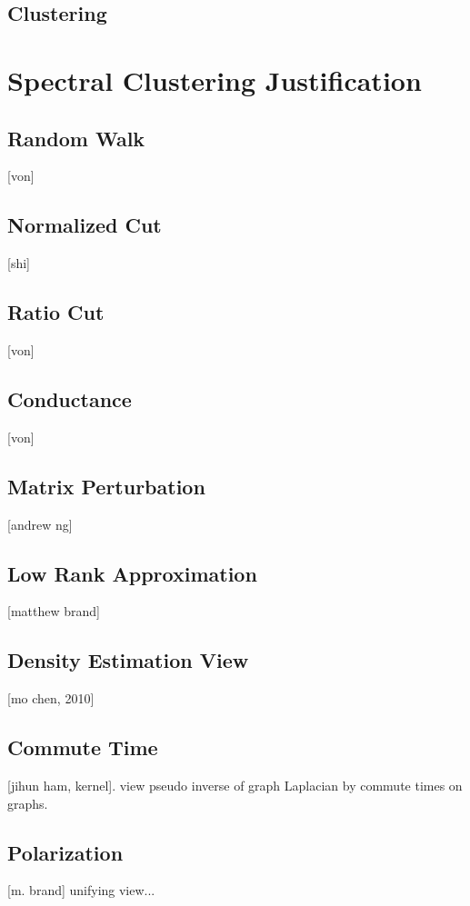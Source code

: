 \subsection{Clustering}


\section{Spectral Clustering Justification}
\label{sec:justification}

\subsection{Random Walk}
[von]

\subsection{Normalized Cut}
[shi]

\subsection{Ratio Cut}
[von]

\subsection{Conductance}
[von]

\subsection{Matrix Perturbation}
[andrew ng]

\subsection{Low Rank Approximation}
[matthew brand]

\subsection{Density Estimation View}
[mo chen, 2010]

\subsection{Commute Time}
[jihun ham, kernel]. 
view pseudo inverse of graph Laplacian by commute times on graphs. 

\subsection{Polarization}
[m. brand] unifying view... 

